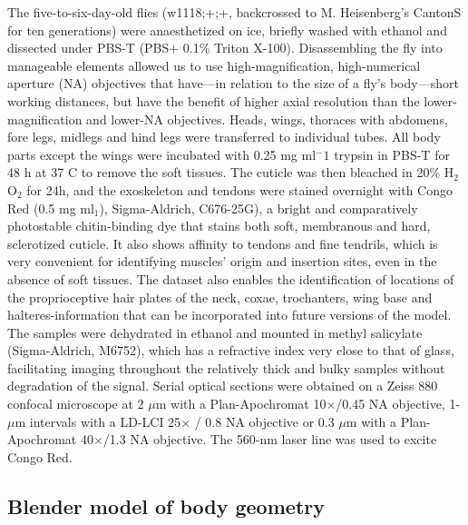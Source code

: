 \documentclass[sn-mathphys-num]{sn-jnl}%
\theoremstyle{thmstyleone}%
\theoremstyle{thmstyletwo}%
\theoremstyle{thmstylethree}%
\begin{document}
The five-to-six-day-old flies (w1118;+;+, backcrossed to M. Heisenberg's CantonS for ten generations) were anaesthetized on ice, briefly washed with ethanol and dissected under PBS-T (PBS+ 0.1\% Triton X-100).
Disassembling the fly into manageable elements allowed us to use high-magnification, high-numerical aperture (NA) objectives that have—in relation to the size of a fly’s body—short working distances, but have the benefit of higher axial resolution than the lower-magnification and lower-NA objectives. 
Heads, wings, thoraces with abdomens, fore legs, midlegs and hind legs were transferred to individual tubes.
All body parts except the wings 
were incubated with 0.25 mg ml$ ^-1 $ trypsin in PBS-T for 48 h at 37 C to remove the soft tissues.
The cuticle was then bleached in 20\% H$ _2 $O$ _2 $ for 24h, and the exoskeleton and tendons were stained overnight with Congo Red (0.5 mg ml$ _1 $), Sigma-Aldrich, C676-25G), a bright and comparatively photostable chitin-binding dye that stains both soft, membranous and hard, sclerotized cuticle.
It also shows affinity to tendons and fine tendrils, which is very convenient for identifying muscles' origin and insertion sites, even in the absence of soft tissues.
The dataset also enables the identification of locations of the proprioceptive hair plates of the neck, coxae, trochanters, wing base and halteres-information that can be incorporated into future versions of the model. 
The samples were dehydrated in ethanol and mounted in methyl salicylate (Sigma-Aldrich, M6752), which has a refractive index very close to that of glass, facilitating imaging throughout the relatively thick and bulky samples without degradation of the signal. 
Serial optical sections were obtained on a Zeiss 880 confocal microscope at 2 $ \mu $m with a Plan-Apochromat 10×/0.45 NA objective, 1-$ \mu $m intervals with a LD-LCI 25$ \times $ / 0.8 NA objective or 0.3 $ \mu $m with a Plan-Apochromat 40×/1.3 NA objective. The 560-nm laser line was used to excite Congo Red.



\subsection{Blender model of body geometry} \label{sec:derivation}
\end{document}
